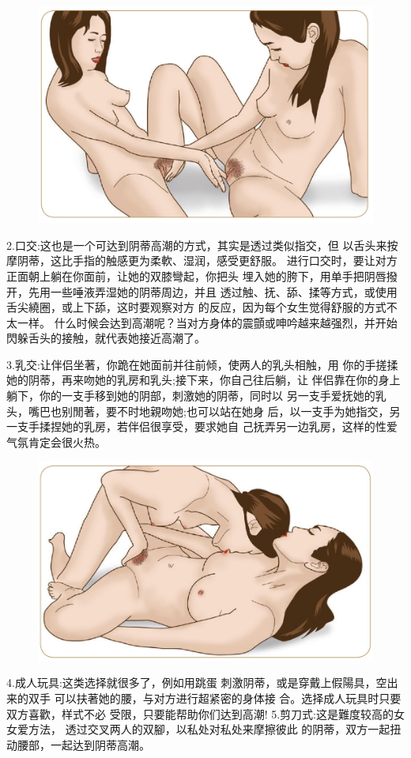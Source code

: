 \documentclass[12pt,UTF8]{ctexbook}
\begin{document}
\begin{figure}[htbp]
	\centering
	\includegraphics[width=0.7\linewidth]{10}
	\caption{}
	\label{fig:1}
\end{figure}

2.口交:这也是一个可达到阴蒂高潮的方式，其实是透过类似指交，但
以舌头来按摩阴蒂，这比手指的触感更为柔軟、湿润，感受更舒服。
进行口交时，要让对方正面朝上躺在你面前，让她的双膝彎起，你把头
埋入她的胯下，用单手把阴唇撥开，先用一些唾液弄湿她的阴蒂周边，并且
透过触、抚、舔、揉等方式，或使用舌尖繞圈，或上下舔，这时要观察对方
的反应，因为每个女生觉得舒服的方式不太一样。
什么时候会达到高潮呢？当对方身体的震顫或呻吟越来越强烈，并开始
閃躲舌头的接触，就代表她接近高潮了。

3.乳交:让伴侣坐著，你跪在她面前并往前倾，使两人的乳头相触，用
你的手搓揉她的阴蒂，再来吻她的乳房和乳头;接下来，你自己往后躺，让
伴侣靠在你的身上躺下，你的一支手移到她的阴部，刺激她的阴蒂，同时以
另一支手爱抚她的乳头，嘴巴也别閒著，要不时地親吻她;也可以站在她身
后，以一支手为她指交，另一支手揉捏她的乳房，若伴侣很享受，要求她自
己抚弄另一边乳房，这样的性爱气氛肯定会很火热。

\begin{figure}[htbp]
	\centering
	\includegraphics[width=0.7\linewidth]{11}
	\caption{}
	\label{fig:1}
\end{figure}

4.成人玩具:这类选择就很多了，例如用跳蛋
刺激阴蒂，或是穿戴上假陽具，空出来的双手
可以扶著她的腰，与对方进行超紧密的身体接
合。选择成人玩具时只要双方喜歡，样式不必
受限，只要能帮助你们达到高潮!
5.剪刀式:这是難度较高的女女爱方法，
透过交叉两人的双腳，以私处对私处来摩擦彼此
的阴蒂，双方一起扭动腰部，一起达到阴蒂高潮。
\end{document}
